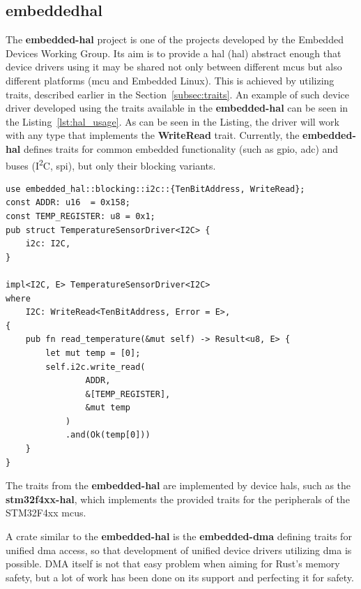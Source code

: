 \subsection{embedded\textendash hal}
\label{subsec:embedded_hal}
The \textbf{embedded-hal} project\cite{rust_embedded_devices_wg_rust-embeddedembedded-hal_2021} is one of the projects developed by the Embedded Devices Working Group.
Its aim is to provide a \acs{hal} (\acl{hal}) abstract enough that device drivers using it may be shared not only between different \acs{mcu}s but also different platforms (\acs{mcu} and Embedded Linux).
This is achieved by utilizing traits, described earlier in the Section~\ref{subsec:traits}.
An example of such device driver developed using the traits available in the \textbf{embedded-hal} can be seen in the Listing~\ref{lst:hal_usage}\cite{rust_embedded_devices_wg_rust-embeddedembedded-hal_2021}.
As can be seen in the Listing, the driver will work with any type that implements the \textbf{WriteRead} trait.
Currently, the \textbf{embedded-hal} defines traits for common embedded functionality (such as \acs{gpio}, \acs{adc}) and buses (I\textsuperscript{2}C, \acs{spi}), but only their blocking variants.

\begin{lstlisting}[caption={Example of an device driver utilizing embedded\textendash hal traits.},label=lst:hal_usage]
use embedded_hal::blocking::i2c::{TenBitAddress, WriteRead};
const ADDR: u16  = 0x158;
const TEMP_REGISTER: u8 = 0x1;
pub struct TemperatureSensorDriver<I2C> {
    i2c: I2C,
}

impl<I2C, E> TemperatureSensorDriver<I2C>
where
    I2C: WriteRead<TenBitAddress, Error = E>,
{
    pub fn read_temperature(&mut self) -> Result<u8, E> {
        let mut temp = [0];
        self.i2c.write_read(
                ADDR,
                &[TEMP_REGISTER],
                &mut temp
            )
            .and(Ok(temp[0]))
    }
}
\end{lstlisting}

The traits from the \textbf{embedded-hal} are implemented by device \acs{hal}s, such as the \textbf{stm32f4xx-hal}\cite{noauthor_stm32-rsstm32f4xx-hal_2021}, which implements the provided traits for the peripherals of the STM32F4xx \acs{mcu}s.

A crate similar to the \textbf{embedded-hal} is the \textbf{embedded-dma} defining traits for unified \acs{dma} access, so that development of unified device drivers utilizing \acs{dma} is possible.
DMA itself is not that easy problem when aiming for Rust's memory safety\cite{aparicio_memory_nodate}, but a lot of work has been done on its support and perfecting it for safety.


